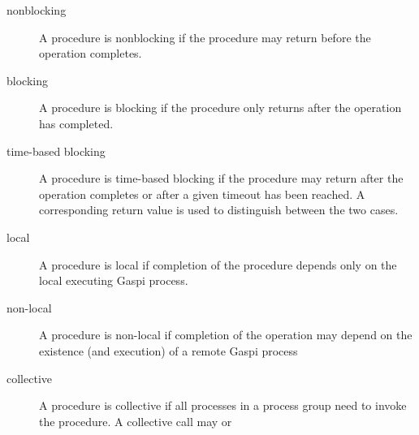 \documentclass[a4paper]{article}
\newlength{\st}\setlength{\st}{0pt}
\newcommand{\GASPI}{{\sc Gaspi}}
\begin{document}
\begin{description}
\item[nonblocking] A procedure is nonblocking if the procedure may
  return before the operation completes.
\begin{center}
\end{center}
\item[blocking] A procedure is blocking if the procedure only returns
  after the operation has completed.
\begin{center}
\end{center}
\item[time-based blocking] A procedure is time-based blocking if the
  procedure may return after the operation completes or after a given
  timeout has been reached. A corresponding return value is used to
  distinguish between the two cases.
\begin{center}
\end{center}
\item[local] A procedure is local if completion of the procedure depends
  only on the local executing \GASPI{} process.
\item[non-local] A procedure is non-local if completion of the
  operation may depend on the existence (and execution) of a remote \GASPI{} process
\item[collective] A procedure is collective if all processes in a
  process group need to invoke the procedure. A collective call may or

\end{description}
\end{document}
